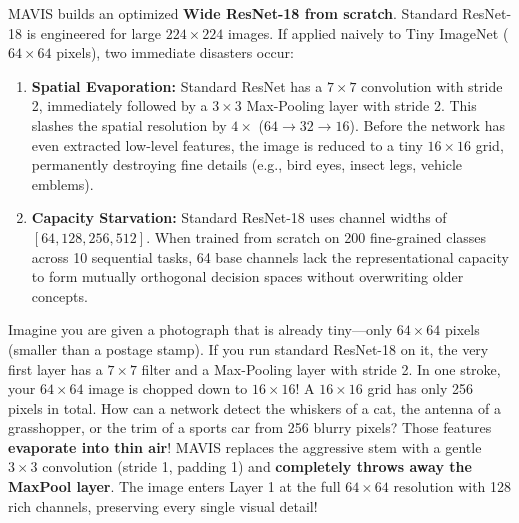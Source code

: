 \documentclass[11pt,a4paper]{article}
\begin{document}
MAVIS builds an optimized \textbf{Wide ResNet-18 from scratch}. Standard ResNet-18 is engineered for large $224 \times 224$ images. If applied naively to Tiny ImageNet ($64 \times 64$ pixels), two immediate disasters occur:
\begin{enumerate}
    \item \textbf{Spatial Evaporation:} Standard ResNet has a $7 \times 7$ convolution with stride 2, immediately followed by a $3 \times 3$ Max-Pooling layer with stride 2. This slashes the spatial resolution by $4\times$ ($64 \to 32 \to 16$). Before the network has even extracted low-level features, the image is reduced to a tiny $16 \times 16$ grid, permanently destroying fine details (e.g., bird eyes, insect legs, vehicle emblems).
    \item \textbf{Capacity Starvation:} Standard ResNet-18 uses channel widths of $[64, 128, 256, 512]$. When trained from scratch on 200 fine-grained classes across 10 sequential tasks, 64 base channels lack the representational capacity to form mutually orthogonal decision spaces without overwriting older concepts.
\end{enumerate}

\begin{callout}
Imagine you are given a photograph that is already tiny—only $64 \times 64$ pixels (smaller than a postage stamp). If you run standard ResNet-18 on it, the very first layer has a $7 \times 7$ filter and a Max-Pooling layer with stride 2. In one stroke, your $64 \times 64$ image is chopped down to $16 \times 16$! A $16 \times 16$ grid has only 256 pixels in total. How can a network detect the whiskers of a cat, the antenna of a grasshopper, or the trim of a sports car from 256 blurry pixels? Those features \textbf{evaporate into thin air}!\newline
MAVIS replaces the aggressive stem with a gentle $3 \times 3$ convolution (stride 1, padding 1) and \textbf{completely throws away the MaxPool layer}. The image enters Layer 1 at the full $64 \times 64$ resolution with 128 rich channels, preserving every single visual detail!
\end{callout}
\end{document}
